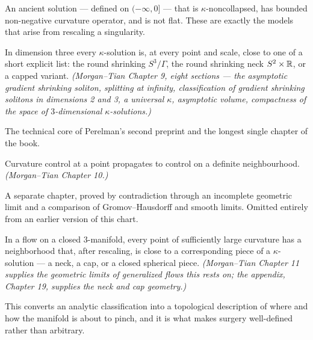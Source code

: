 \begin{definition}
  \label{def:kappa-solution}
  An ancient solution --- defined on $(-\infty, 0]$ --- that is
  $\kappa$-noncollapsed, has bounded non-negative curvature operator, and is not
  flat. These are exactly the models that arise from rescaling a singularity.
\end{definition}

\begin{theorem}
  \label{thm:kappa-classification}
  In dimension three every $\kappa$-solution is, at every point and scale, close
  to one of a short explicit list: the round shrinking $S^3/\Gamma$, the round
  shrinking neck $S^2 \times \mathbb{R}$, or a capped variant.
  \emph{(Morgan--Tian Chapter 9, eight sections --- the asymptotic gradient
  shrinking soliton, splitting at infinity, classification of gradient shrinking
  solitons in dimensions 2 and 3, a universal $\kappa$, asymptotic volume,
  compactness of the space of $3$-dimensional $\kappa$-solutions.)}

  The technical core of Perelman's second preprint and the longest single
  chapter of the book.
\end{theorem}

\begin{theorem}
  \label{thm:bounded-curvature}
  Curvature control at a point propagates to control on a definite
  neighbourhood. \emph{(Morgan--Tian Chapter 10.)}

  A separate chapter, proved by contradiction through an incomplete geometric
  limit and a comparison of Gromov--Hausdorff and smooth limits. Omitted
  entirely from an earlier version of this chart.
\end{theorem}

\begin{theorem}
  \label{thm:canonical-nbhd}
  In a flow on a closed $3$-manifold, every point of sufficiently large
  curvature has a neighborhood that, after rescaling, is close to a
  corresponding piece of a $\kappa$-solution --- a neck, a cap, or a closed
  spherical piece. \emph{(Morgan--Tian Chapter 11 supplies the geometric limits
  of generalized flows this rests on; the appendix, Chapter 19, supplies the
  neck and cap geometry.)}

  This converts an analytic classification into a topological description of
  where and how the manifold is about to pinch, and it is what makes surgery
  well-defined rather than arbitrary.
\end{theorem}

